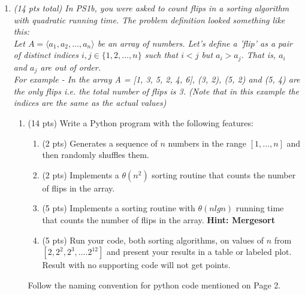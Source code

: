 \documentclass[12pt]{article}
\theoremstyle{remark}
\begin{document}
\begin{enumerate}
\begin{enumerate}
\end{enumerate}

\pagebreak

\item {\itshape (14 pts total)
In PS1b, you were asked to count flips in a sorting algorithm with quadratic running time. The problem definition looked something like this:\\
Let $A = \langle a_{1}, a_{2}, \ldots, a_{n} \rangle$ be an array of numbers. Let's define a \textit{'flip'} as a pair of distinct indices $i, j \in \{ 1, 2, \ldots, n\}$ such that $i < j$ but $a_{i} > a_{j}$. That is, $a_{i}$ and $a_{j}$ are out of order.\\ For example - In the array A = [1, 3, 5, 2, 4, 6], (3, 2), (5, 2) and (5, 4) are the only flips i.e. the total number of flips is 3. (Note that in this example the indices are the same as the actual values)}\\

\begin{enumerate}
    \item 
(14 pts) Write a Python program with the following features:
\begin{enumerate}
    \item (2 pts) Generates a sequence of $n$ numbers in the range $[1, \ldots, n]$ and then randomly shuffles them.
    \item (2 pts) Implements a $\theta(n^2)$ sorting routine that counts the number of flips in the array.
    \item (5 pts) Implements a sorting routine with $\theta(n lg n)$ running time that counts the number of flips in the array. \textbf{Hint: Mergesort}
    \item (5 pts) Run your code, both sorting algorithms, on values of $n$ from $[2, 2^2, 2^3, .... 2^{12}]$ and present your results in a table or labeled plot. Result with no supporting code will not get points. 
\end{enumerate}
Follow the naming convention for python code mentioned on Page 2.



\end{enumerate}
\end{enumerate}
\end{document}
